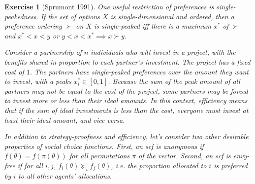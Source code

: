 \documentclass[letter, 10pt]{article}
\theoremstyle{basic}
\newtheorem{exercise}{Exercise}[section]
\begin{document}
\begin{spacing}{1.0}
\begin{exercise}[Sprumont 1991]
  One useful restriction of preferences is \emph{single-peakedness}. If the
  set of options $X$ is single-dimensional and ordered, then a preference
  ordering $\succ$ on $X$ is single-peaked iff there is a maximum $x^*$ of
  $\succ$ and $x^* < x < y$ or $y < x < x^* \implies x \succ y$.

  \hspace{1em}
  Consider a partnership of $n$ individuals who will invest in a project,
  with the benefits shared in proportion to each partner's investment. The
  project has a fixed cost of $1$. The partners have single-peaked
  preferences over the amount they want to invest, with a peaks $x_i^* \in
  [0,1]$. Because the sum of the peak amount of all partners may not be
  equal to the cost of the project, some partners may be forced to invest
  more or less than their ideal amounts. In this context, efficiency means
  that if the sum of ideal investments is less than the cost, everyone must
  invest at least their ideal amount, and vice versa.

  \hspace{1em}
  In addition to strategy-proofness and efficiency, let's consider two
  other desirable properties of social choice functions. First, an scf is
  \emph{anonymous} if $f(\theta)=f(\pi(\theta))$ for all permutations $\pi$
  of the vector. Second, an scf is \emph{envy-free} if for all $i,j$,
  $f_i(\theta) \succeq_i f_j(\theta)$, i.e. the proportion allocated to $i$
  is preferred by $i$ to all other agents' allocations.


\end{exercise}
\end{spacing}
\end{document}
